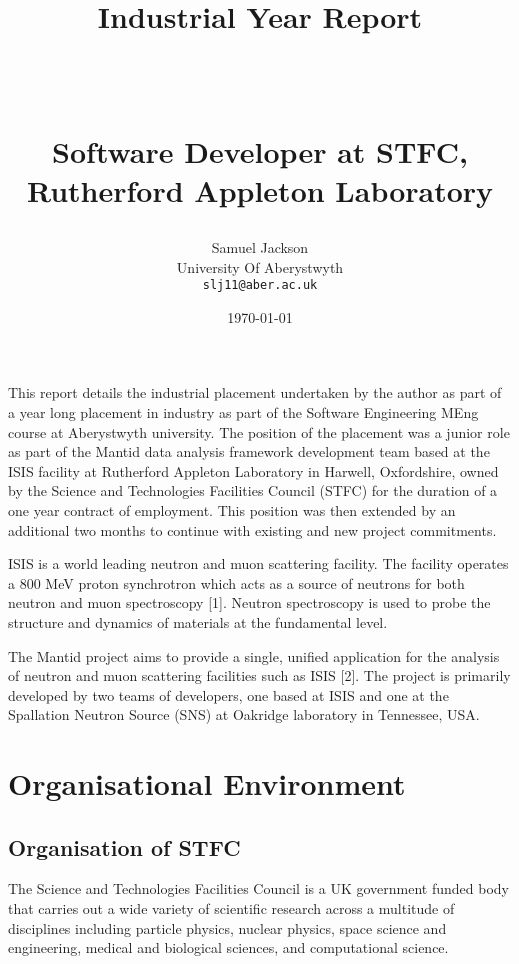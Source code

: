 \documentclass[paper=a4, fontsize=11pt]{scrartcl}	%
\title{
	\vspace{-1in} 	\usefont{OT1}{bch}{b}{n}
	\huge \strut Industrial Year Report \strut \\
	\Large \bfseries \strut Software Developer at STFC, Rutherford Appleton Laboratory \strut
}
\author{
	\usefont{OT1}{bch}{m}{n} Samuel Jackson
	\\ \usefont{OT1}{bch}{m}{n} University Of Aberystwyth
	\\   \texttt{slj11@aber.ac.uk}
}
\date{\today}
\numberwithin{equation}{section}															%
\numberwithin{figure}{section}																%
\numberwithin{table}{section}
\begin{document}
	\maketitle
	\clearpage
	\tableofcontents
	\clearpage

This report details the industrial placement undertaken by the author as
part of a year long placement in industry as part of the Software
Engineering MEng course at Aberystwyth university. The position of the
placement was a junior role as part of the Mantid data analysis
framework development team based at the ISIS facility at Rutherford
Appleton Laboratory in Harwell, Oxfordshire, owned by the Science and
Technologies Facilities Council (STFC) for the duration of a one year
contract of employment. This position was then extended by an additional
two months to continue with existing and new project commitments.

ISIS is a world leading neutron and muon scattering facility. The
facility operates a 800 MeV proton synchrotron which acts as a source of
neutrons for both neutron and muon spectroscopy {[}1{]}. Neutron
spectroscopy is used to probe the structure and dynamics of materials at
the fundamental level.

The Mantid project aims to provide a single, unified application for the
analysis of neutron and muon scattering facilities such as ISIS {[}2{]}.
The project is primarily developed by two teams of developers, one based
at ISIS and one at the Spallation Neutron Source (SNS) at Oakridge
laboratory in Tennessee, USA.

\section{Organisational Environment}\label{organisational-environment}

\subsection{Organisation of STFC}\label{organisation-of-stfc}

The Science and Technologies Facilities Council is a UK government
funded body that carries out a wide variety of scientific research
across a multitude of disciplines including particle physics, nuclear
physics, space science and engineering, medical and biological sciences,
and computational science.
\end{document}
